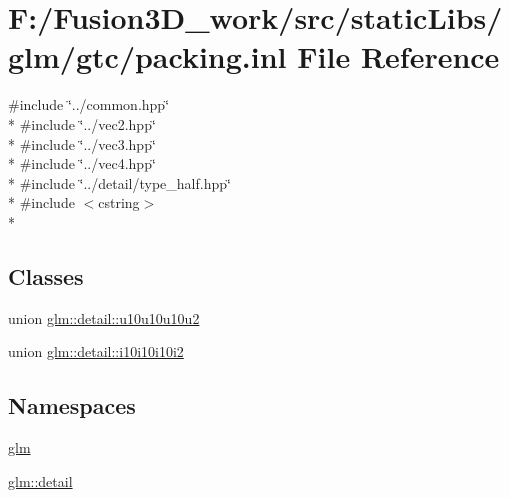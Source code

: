 \hypertarget{packing_8inl}{}\section{F\+:/\+Fusion3\+D\+\_\+work/src/static\+Libs/glm/gtc/packing.inl File Reference}
\label{packing_8inl}
{\ttfamily \#include \char`\"{}../common.\+hpp\char`\"{}}\\*
{\ttfamily \#include \char`\"{}../vec2.\+hpp\char`\"{}}\\*
{\ttfamily \#include \char`\"{}../vec3.\+hpp\char`\"{}}\\*
{\ttfamily \#include \char`\"{}../vec4.\+hpp\char`\"{}}\\*
{\ttfamily \#include \char`\"{}../detail/type\+\_\+half.\+hpp\char`\"{}}\\*
{\ttfamily \#include $<$cstring$>$}\\*
\subsection*{Classes}
\begin{DoxyCompactItemize}
\item 
union \hyperlink{unionglm_1_1detail_1_1u10u10u10u2}{glm\+::detail\+::u10u10u10u2}
\item 
union \hyperlink{unionglm_1_1detail_1_1i10i10i10i2}{glm\+::detail\+::i10i10i10i2}
\end{DoxyCompactItemize}
\subsection*{Namespaces}
\begin{DoxyCompactItemize}
\item 
 \hyperlink{namespaceglm}{glm}
\item 
 \hyperlink{namespaceglm_1_1detail}{glm\+::detail}
\end{DoxyCompactItemize}
